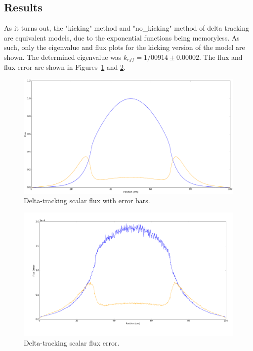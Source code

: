 \documentclass{article}
\begin{document}
	\subsection{Results}
	As it turns out, the "kicking" method and "no\_kicking" method of delta tracking are equivalent models, due to the exponential functions being memoryless. As such, only the eigenvalue and flux plots for the kicking version of the model are shown. The determined eigenvalue was $k_{eff} = 1/00914 \pm 0.00002$. The flux and flux error are shown in Figures~\ref{fig:dt_flux} and \ref{fig:dt_flux_error}.
	
	\begin{figure}
		\centering
		\includegraphics[scale=0.35]{dt_flux.png}
		\caption{Delta-tracking scalar flux with error bars.}
		\label{fig:dt_flux}
	\end{figure}
	\begin{figure}
		\centering
		\includegraphics[scale=0.3]{dt_flux_erreur.png}
		\caption{Delta-tracking scalar flux error.}
		\label{fig:dt_flux_error}
	\end{figure}
	
\end{document}
